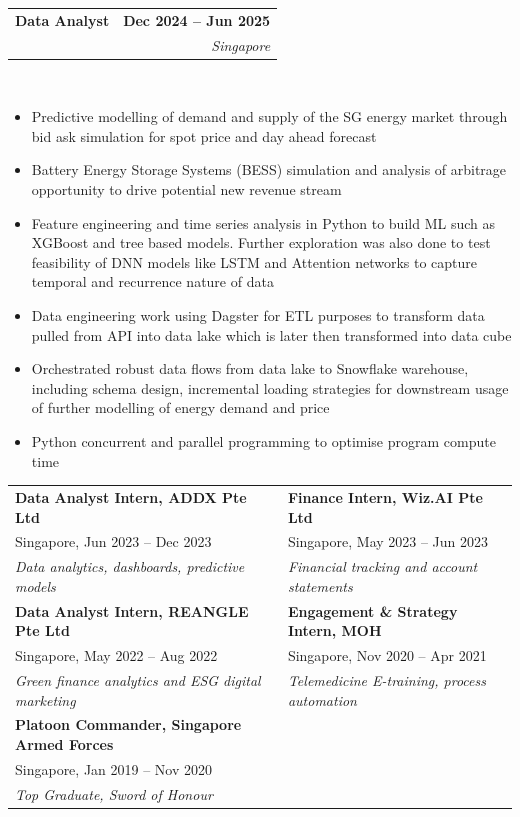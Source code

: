 \documentclass[10pt,a4paper]{article}
\makeatletter
\newcommand{\cvtaglinefirstfontsize}{11}  %
\newcommand{\cvtaglinesecondfontsize}{10} %
\newcommand{\cvbulletfontsize}{10}        %
\newcommand{\cvtagline}[5][1em]{
  \vspace{-1em} %
  \noindent
  \begin{tabularx}{\textwidth}{@{}Xr@{}}
    {\fontsize{\cvtaglinefirstfontsize}{\cvtaglinefirstfontsize}\selectfont\textbf{#2}}
    &
    {\fontsize{\cvtaglinefirstfontsize}{\cvtaglinefirstfontsize}\selectfont\textbf{#3}}
    \\ %
    {\fontsize{\cvtaglinesecondfontsize}{\cvtaglinesecondfontsize}\selectfont{#4}}
    &
    {\fontsize{\cvtaglinesecondfontsize}{\cvtaglinesecondfontsize}\selectfont\textit{#5}}
    \\ %
  \end{tabularx}
  \\
  \vspace{#1} %
}
\newcommand{\cvbullets}[2][1em]{
  \vspace{-2.1em} %
  {\fontsize{\cvbulletfontsize}{\cvbulletfontsize}\selectfont
    \begin{itemize}[left=0pt,labelsep=1em]
        \setlength\itemsep{0.2em} %
        \setlength\labelwidth{1em} %
        \setlength\parskip{0pt} %
        #2
    \end{itemize}
  }
  \vspace{#1} %
}
\makeatother
\begin{document}
\cvtagline{Data Analyst}{Dec 2024 -- Jun 2025}{Flo Energy Pte Ltd $ |
$ Supervisor: Nils Terpstra [Head of Data \& Analytics]}{Singapore}
\vspace{0.5em}
\cvbullets{
\item Predictive modelling of demand and supply of the SG energy
  market through bid ask simulation for spot price and day ahead forecast
\item Battery Energy Storage Systems (BESS) simulation and analysis
  of arbitrage opportunity to drive potential new revenue stream
\item Feature engineering and time series analysis in Python to build
  ML such as XGBoost and tree based models. Further exploration was
  also done to test feasibility of DNN models like LSTM and Attention
  networks to capture temporal and recurrence nature of data
\item Data engineering work using Dagster for ETL purposes to
  transform data pulled from API into data lake which is later then
  transformed into data cube
\item Orchestrated robust data flows from data lake to Snowflake
  warehouse, including schema design, incremental loading strategies
  for downstream usage of further modelling of energy demand and price
\item Python concurrent and parallel programming to optimise program
  compute time
}

\vspace{-0.5em}

\begin{tabularx}{\textwidth}{@{}X X@{}}
  \textbf{Data Analyst Intern, ADDX Pte Ltd} & \textbf{Finance
  Intern, Wiz.AI Pte Ltd} \\
  Singapore, Jun 2023 -- Dec 2023 & Singapore, May 2023 -- Jun 2023 \\
  \emph{Data analytics, dashboards, predictive models} &
  \emph{Financial tracking and account statements} \\
  [0.5em]
  \textbf{Data Analyst Intern, REANGLE Pte Ltd} & \textbf{Engagement
  \& Strategy Intern, MOH} \\
  Singapore, May 2022 -- Aug 2022 & Singapore, Nov 2020 -- Apr 2021 \\
  \emph{Green finance analytics and ESG digital marketing} &
  \emph{Telemedicine E-training, process automation} \\
  [0.5em]
  \textbf{Platoon Commander, Singapore Armed Forces} & \\
  Singapore, Jan 2019 -- Nov 2020 & \\
  \emph{Top Graduate, Sword of Honour} & \\
\end{tabularx}
\vspace{1.5em}
\end{document}
